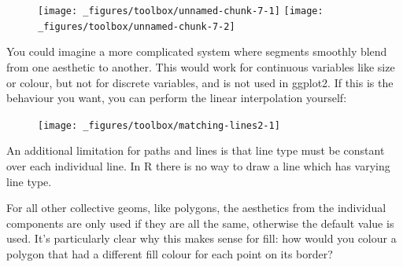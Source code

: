 \begin{figure}[H]
  \texttt{[image: \_figures/toolbox/unnamed-chunk-7-1]}%
  \texttt{[image: \_figures/toolbox/unnamed-chunk-7-2]}
\end{figure}

You could imagine a more complicated system where segments smoothly
blend from one aesthetic to another. This would work for continuous
variables like size or colour, but not for discrete variables, and is
not used in ggplot2. If this is the behaviour you want, you can perform
the linear interpolation yourself:

\begin{Shaded}
\begin{Highlighting}[]
\StringTok{ }\NormalTok{(} \NormalTok{))}
\StringTok{ }\NormalTok{(}
   
    
    
\NormalTok{)}
 \StringTok{ }
\StringTok{  }\NormalTok{(} \NormalTok{) +}
\StringTok{  }\NormalTok{(}  \NormalTok{)}
\end{Highlighting}
\end{Shaded}

\begin{figure}[H]
  \centering
  \texttt{[image: \_figures/toolbox/matching-lines2-1]}
\end{figure}

An additional limitation for paths and lines is that line type must be
constant over each individual line. In R there is no way to draw a line
which has varying line type.  

For all other collective geoms, like polygons, the aesthetics from the
individual components are only used if they are all the same, otherwise
the default value is used. It's particularly clear why this makes sense
for fill: how would you colour a polygon that had a different fill
colour for each point on its border? 

